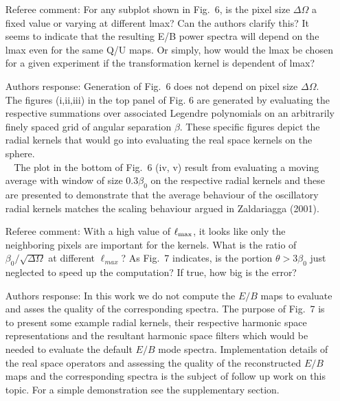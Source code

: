 \documentclass[12pt]{article}
\newcommand{\revisit}{\textcolor{magenta}}
\begin{document}
\begin{itemize}
\item[{Referee comment: }] For any subplot shown in Fig.~6, is the pixel size $\Delta \Omega$ a fixed value or varying at different lmax? Can the authors clarify this? It seems to indicate that the resulting E/B power spectra will depend on the lmax even for the same Q/U maps. Or simply, how would the lmax be chosen for a given experiment if the transformation kernel is dependent of lmax?
\item[{Authors response: }] Generation of Fig.~6 does not depend on pixel size $\Delta \Omega$. The figures (\rm i,\rm {ii},\rm {iii}) in the top panel of Fig. 6 are generated by evaluating the respective summations over associated Legendre polynomials on an arbitrarily finely spaced grid of angular separation $\beta$. These specific figures depict the radial kernels that would go into evaluating the real space kernels on the sphere.\\
$~~~~$The plot in the bottom of Fig.~6 (\rm iv, \rm v) result from evaluating a moving average with window of size $0.3 \beta_0$ on the respective radial kernels and these are presented to demonstrate that the average behaviour of the oscillatory radial kernels matches the scaling behaviour argued in Zaldariagga (2001).

\item[{Referee comment: }] With a high value of $\ell_{\rm max}$, it looks like only the neighboring pixels are important for the kernels. What is the ratio of $\beta_0/\sqrt{\Delta \Omega}$ at different $\ell_{max}$? As Fig.~7 indicates, is the portion $\theta > 3\beta_0$ just neglected to speed up the computation? If true, how big is the error?
\item[{Authors response: }] In this work we do not compute the $E/B$ maps to evaluate and asses the quality of the corresponding spectra. The purpose of Fig.~7 is to present some example radial kernels, their respective harmonic space representations and the resultant harmonic space filters which would be needed to evaluate the default $E/B$ mode spectra. Implementation details of the real space operators and assessing the quality of the reconstructed $E/B$ maps and the corresponding spectra is the subject of follow up work on this topic. For a simple demonstration see the supplementary section.



\end{itemize}
\end{document}
